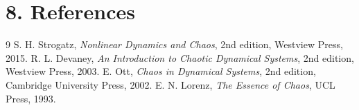 \section*{8. References}
\begin{thebibliography}{9}
 S. H. Strogatz, \emph{Nonlinear Dynamics and Chaos}, 2nd edition, Westview Press, 2015.
 R. L. Devaney, \emph{An Introduction to Chaotic Dynamical Systems}, 2nd edition, Westview Press, 2003.
 E. Ott, \emph{Chaos in Dynamical Systems}, 2nd edition, Cambridge University Press, 2002.
 E. N. Lorenz, \emph{The Essence of Chaos}, UCL Press, 1993.
\end{thebibliography}

